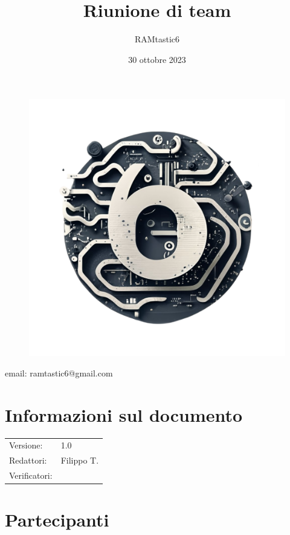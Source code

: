 \documentclass[12pt, oneside]{article}
\author{RAMtastic6}
\begin{document}
\thispagestyle{empty}
\title{Riunione di team}
\date{30 ottobre 2023} %

\maketitle
\begin{figure}[h]
	\centering
	\includegraphics[scale=0.3]{logo.png}
	\label{}
\end{figure}
\begin{center}
    email: ramtastic6@gmail.com
\end{center}

\section*{Informazioni sul documento}
\begin{tabular}{ll}
Versione: & 1.0 \\
Redattori: & Filippo T. \\
Verificatori: &  
\end{tabular}
\newpage

\tableofcontents
\newpage

\section{Partecipanti}
\end{document}
